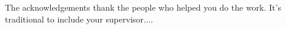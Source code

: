 The acknowledgements thank the people who helped you do the work. It's traditional to include your supervisor....